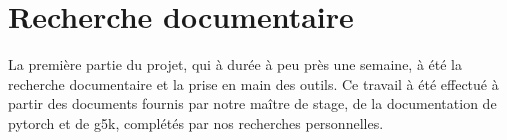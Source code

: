 \section{Recherche documentaire}
La première partie du projet, qui à durée à peu près une semaine, à été la recherche documentaire et la prise en main des outils.
Ce travail à été effectué à partir des documents fournis par notre maître de stage, de la documentation de \gls{pytorch}\autocite{60MinBlitzTorch,ByExampleTorch,Classify,doc_pytorch} et de \gls{g5k}\autocite{DeepLoriaG5k,TutoIbadaG5k}, complétés par nos recherches personnelles.


